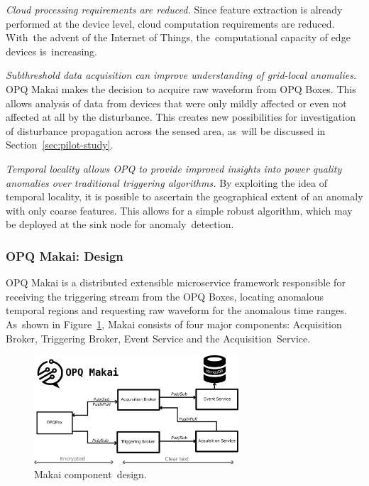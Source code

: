 \documentclass[energies,article,accept,moreauthors,pdftex]{Definitions/mdpi}
\begin{document}
{\em Cloud processing requirements are reduced.} Since feature extraction is already performed at the device level, cloud computation requirements are reduced. With~the advent of the Internet of Things, the~computational capacity of edge devices is~increasing.

{\em Subthreshold data acquisition can improve understanding of grid-local anomalies.} OPQ Makai makes the decision to acquire raw waveform from OPQ Boxes. This allows analysis of data from devices that were only mildly affected or even not affected at all by the disturbance. This creates new possibilities for investigation of disturbance propagation across the sensed area, as~will be discussed in Section~\ref{sec:pilot-study}.

{\em Temporal locality allows OPQ to provide improved insights into power quality anomalies over traditional triggering algorithms.} By exploiting the idea of temporal locality, it is possible to ascertain the geographical extent of an anomaly with only coarse features. This allows for a simple robust algorithm, which may be deployed at the sink node for anomaly~detection.

\subsubsection*{OPQ Makai: Design}

OPQ Makai is a distributed extensible microservice framework responsible for receiving the triggering stream from the OPQ Boxes, locating anomalous temporal regions and requesting raw waveform for the anomalous time ranges. As~shown in Figure~\ref{fig:makai-design}, Makai consists of four major components: Acquisition Broker, Triggering Broker, Event Service and the Acquisition~Service.

\begin{figure}[H]
\center \includegraphics[width=3in]{images/makai/makai_main.pdf}
\caption{Makai component~design.}
\label{fig:makai-design}
\end{figure}
\end{document}
